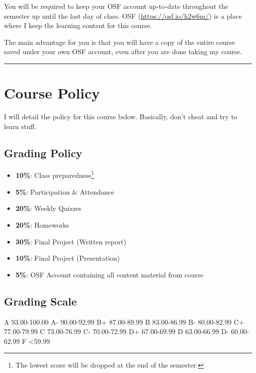 \documentclass[11pt,]{article}
\begin{document}
You will be required to keep your OSF account up-to-date throughout the
semester up until the last day of class. OSF
(\url{https://osf.io/h2w6m/}) is a place where I keep the learning
content for this course.

The main advantage for you is that you will have a copy of the entire
course saved under your own OSF account, even after you are done taking
my course.

\begin{center}\rule{0.5\linewidth}{0.5pt}\end{center}

\hypertarget{course-policy}{%
\section{Course Policy}\label{course-policy}}

I will detail the policy for this course below. Basically, don't cheat
and try to learn stuff.

\hypertarget{grading-policy}{%
\subsection{Grading Policy}\label{grading-policy}}

\begin{itemize}
\item
  \textbf{10\%}: Class preparedness\footnote{The lowest score will be
    dropped at the end of the semester.}
\item
  \textbf{5\%}: Participation \& Attendance
\item
  \textbf{20\%}: Weekly Quizzes
\item
  \textbf{20\%}: Homeworks
\item
  \textbf{30\%}: Final Project (Written report)
\item
  \textbf{10\%}: Final Project (Presentation)
\item
  \textbf{5\%}: OSF Account containing all content material from course
\end{itemize}

\hypertarget{grading-scale}{%
\subsection{Grading Scale}\label{grading-scale}}

A 93.00-100.00 \textbar{} A- 90.00-92.99 B+ 87.00-89.99 \textbar{} B
83.00-86.99 \textbar{} B- 80.00-82.99 C+ 77.00-79.99 \textbar{} C
73.00-76.99 \textbar{} C- 70.00-72.99 D+ 67.00-69.99 \textbar{} D
63.00-66.99 \textbar{} D- 60.00-62.99 F \textless59.99
\end{document}
